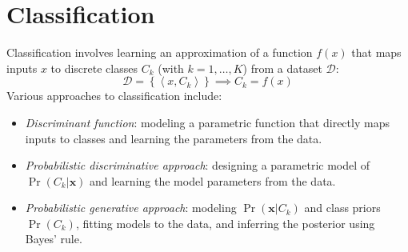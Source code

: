 \section{Classification}

Classification involves learning an approximation of a function $f(x)$ that maps inputs $x$ to discrete classes $C_k$ (with $k=1,\dots,K$) from a dataset $\mathcal{D}$: 
\[\mathcal{D}=\left\{ \left\langle x,C_k \right\rangle \right\} \implies C_k=f(x)\]
Various approaches to classification include:
\begin{itemize}
    \item \textit{Discriminant function}: modeling a parametric function that directly maps inputs to classes and learning the parameters from the data.
    \item \textit{Probabilistic discriminative approach}: designing a parametric model of $\Pr(C_k|\textbf{x})$ and learning the model parameters from the data.
    \item \textit{Probabilistic generative approach}: modeling $\Pr(\textbf{x}|C_k)$ and class priors $\Pr(C_k)$, fitting models to the data, and inferring the posterior using Bayes' rule.
\end{itemize}









